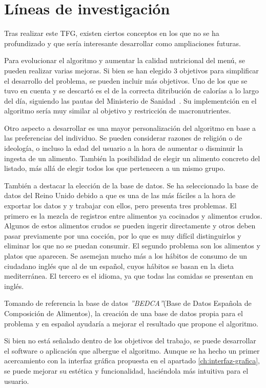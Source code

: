 \chapter{Líneas de investigación}
\label{ch:lineas-investigacion}

Tras realizar este TFG, existen ciertos conceptos en los que no se ha profundizado y que sería interesante desarrollar como ampliaciones futuras.

Para evolucionar el algoritmo y aumentar la calidad nutricional del menú, se pueden realizar varias mejoras. Si bien se han elegido 3 objetivos para simplificar el desarrollo del problema, se pueden incluir más objetivos. Uno de los que se tuvo en cuenta y se descartó es el de la correcta ditribución de calorías a lo largo del día, siguiendo las pautas del Ministerio de Sanidad~\cite{alimentacion_saludable}. Su implementción en el algoritmo sería muy similar al objetivo y restricción de macronutrientes.

Otro aspecto a desarrollar es una mayor personalización del algoritmo en base a las preferencias del individuo. Se pueden considerar razones de religión o de ideología, o incluso la edad del usuario a la hora de aumentar o disminuir la ingesta de un alimento. También la posibilidad de elegir un alimento concreto del listado, más allá de elegir todos los que pertenecen a un mismo grupo.

También a destacar la elección de la base de datos. Se ha seleccionado la base de datos del Reino Unido debido a que es una de las más fáciles a la hora de exportar los datos y y trabajar con ellos, pero presenta tres problemas. El primero es la mezcla de registros entre alimentos ya cocinados y alimentos crudos. Algunos de estos alimentos crudos se pueden ingerir directamente y otros deben pasar previamente por una cocción, por lo que es muy difícil distinguirlos y eliminar los que no se puedan consumir. El segundo problema son los alimentos y platos que aparecen. Se asemejan mucho más a los hábitos de consumo de un ciudadano inglés que al de un español, cuyos hábitos se basan en la dieta mediterránea. El tercero es el idioma, ya que todas las comidas se presentan en inglés.

Tomando de referencia la base de datos \textit{''BEDCA''}(Base de Datos Española de Composición de Alimentos), la creación de una base de datos propia para el problema y en español ayudaría a mejorar el resultado que propone el algoritmo.

Si bien no está señalado dentro de los objetivos del trabajo, se puede desarrollar el software o aplicación que albergue el algoritmo. Aunque se ha hecho un primer acercamiento con la interfaz gráfica propuesta en el apartado \ref{ch:interfaz-grafica}, se puede mejorar su estética y funcionalidad, haciéndola más intuitiva para el usuario.

